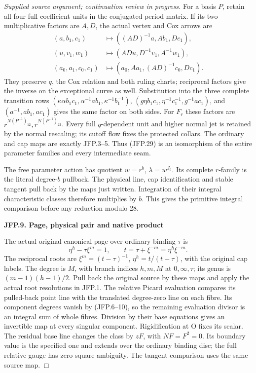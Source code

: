 \begin{proof}[Supplied source argument; continuation review in progress]
For a basis \(P\), retain all four full coefficient units in
the conjugated period matrix. If its two multiplicative factors
are \(A,D\), the actual vertex and Cox arrows are
\[
\begin{split}
 (a,b_1,c_1)&\mapsto((AD)^{-1}a,Ab_1,Dc_1),\\
 (u,v_1,w_1)&\mapsto(ADu,D^{-1}v_1,A^{-1}w_1),\\
 (a_0,a_1,c_0,c_1)&\mapsto(a_0,Aa_1,(AD)^{-1}c_0,Dc_1).
\end{split}
\tag{JFP.37}
\]
They preserve \(q\), the Cox relation and both ruling charts;
reciprocal factors give the inverse on the exceptional curve
as well. Substitution into the three complete transition rows
\((\kappa\alpha b_1c_1,\alpha^{-1}ab_1,\kappa^{-1}b_1^{-1})\),
\((g\eta b_1c_1,\eta^{-1}c_1^{-1},g^{-1}ac_1)\), and
\((a^{-1},ab_1,ac_1)\) gives the same factor on both sides.
For \(F_r\) these factors are
\(r^{N(P^{-1})_{12}},r^{N(P^{-1})_{22}}\). Every full
\(q\)-dependent unit and higher normal jet is retained by the
normal rescaling; its cutoff flow fixes the protected collars.
The ordinary and cap maps are exactly JFP.3--5. Thus (JFP.29)
is an isomorphism of the entire parameter families and every
intermediate seam.

The free parameter action has quotient \(w=r^b\),
\(\lambda=w^{J_0}\). Its complete \(r\)-family is the literal
degree-\(b\) pullback. The physical line, cap identification and
stable tangent pull back by the maps just written. Integration
of their integral characteristic classes therefore multiplies
by \(b\). This gives the primitive integral comparison before
any reduction modulo 28.

\par

\medskip\noindent\textbf{JFP.9. Page, physical pair and native product}

\par\nobreak

The actual original canonical page over ordinary binding
\(\tau\) is
\[
 \eta^h-\tau\xi^m=1,\qquad
 t=\tau+\xi^{-m}=\eta^h\xi^{-m}.
\tag{JFP.38}
\]
The reciprocal roots are \(\xi^m=(t-\tau)^{-1}\),
\(\eta^h=t/(t-\tau)\), with the original cap labels.
The degree is \(M\), with branch indices \(h,m,M\) at
\(0,\infty,\tau\); its genus is \((m-1)(h-1)/2\).
Pull back the original source by these maps and apply the
actual root resolutions in JFP.1. The relative Picard
evaluation compares its pulled-back point line with the
translated degree-zero line on each fibre. Its component
degrees vanish by (JFP.6--10), so the remaining evaluation
divisor is an integral sum of whole fibres. Division by their
base equations gives an invertible map at every singular
component. Rigidification at O fixes its scalar. The residual
base line changes the class by \(zF\), with \(NF=F^2=0\).
Its boundary value is the specified one and extends over the
ordinary binding disc; the full relative gauge has zero square
ambiguity. The tangent comparison uses the same source map.


\end{proof}
